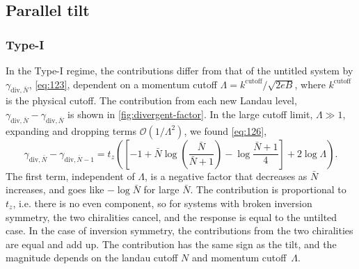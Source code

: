\FloatBarrier
\subsection{Parallel tilt}
\subsubsection{Type-I}
In the Type-I regime, the contributions differ from that of the untitled system by \( \gamma_{\text{div}, \bar{N}} \), \cref{eq:123}, dependent on a momentum cutoff \( \Lambda = k^{\text{cutoff}} /\sqrt{2 e B}  \), where \(k^{\text{cutoff}}\) is the physical cutoff.
The contribution from each new Landau level, \( \gamma_{\text{div}, \bar{N}}-\gamma_{\text{div}, \bar{N}} \) is shown in \cref{fig:divergent-factor}.
In the large cutoff limit, \( \Lambda \gg 1 \), expanding and dropping terms \( \mathcal{O}(1 /\Lambda^2) \), we found \cref{eq:126},
\[
  \gamma_{\text{div}, \bar{N}} - \gamma_{\text{div}, \bar{N}-1} =
  t_z
  \left(
    \left[
      -1 + \bar{N} \log\left(\frac{\bar{N}}{\bar{N}+1}\right) - \log \frac{\bar{N}+1}{4}
    \right]
    + 2 \log\Lambda
  \right).
\]
The first term, independent of \( \Lambda \), is a negative factor that decreases as \( \bar{N} \) increases, and goes like \( -\log \bar{N} \) for large \( \bar{N} \).
The contribution is proportional to \( t_z \), i.e. there is no even component, so for systems with broken inversion symmetry, the two chiralities cancel, and the response is equal to the untilted case.
In the case of inversion symmetry, the contributions from the two chiralities are equal and add up.
The contribution has the same sign as the tilt, and the magnitude depends on the landau cutoff \( N \) and momentum cutoff~\( \Lambda \).
\nowidow[3]

